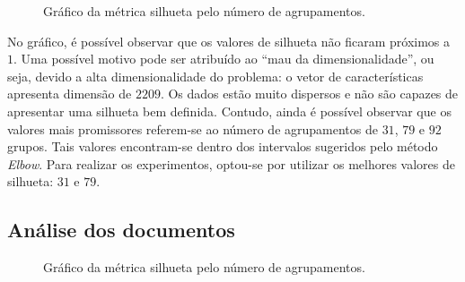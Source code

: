 \documentclass[conference]{IEEEtran}
\begin{document}
\begin{figure}[!h]
	\centering
	{
	}
	\caption{\small Gráfico da métrica silhueta pelo número de agrupamentos.}
	\label{fig:silhueta}
\end{figure}

No gráfico, é possível observar que os valores de silhueta não ficaram próximos a $1$. Uma possível motivo pode ser atribuído ao ``mau da dimensionalidade'', ou seja, devido a alta dimensionalidade do problema: o vetor de características apresenta dimensão de $2209$.  Os dados estão muito dispersos e não são capazes de apresentar uma silhueta bem definida. Contudo, ainda é possível observar que os valores mais promissores referem-se ao número de agrupamentos de $31$, $79$ e $92$ grupos. Tais valores encontram-se dentro dos intervalos sugeridos pelo método \textit{Elbow}. Para realizar os experimentos, optou-se por utilizar os melhores valores de silhueta: $31$ e $79$.


\subsection{Análise dos documentos}

\begin{figure}[!h]
	\centering
	{
	}
	\caption{\small Gráfico da métrica silhueta pelo número de agrupamentos.}
	\label{fig:silhueta}
\end{figure}
\end{document}
